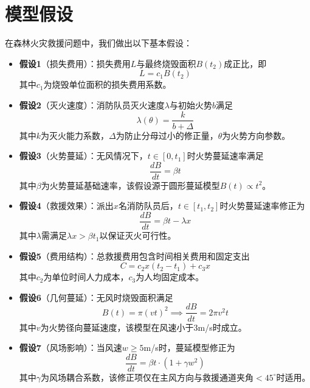 \section{模型假设}\label{sec:Premise}

在森林火灾救援问题中，我们做出以下基本假设：

\begin{itemize}[leftmargin=2em]
    \item \textbf{假设1}（损失费用）：损失费用$L$与最终烧毁面积$B(t_2)$成正比，即
        \begin{equation}
            L = c_1 B(t_2)
        \end{equation}
        其中$c_1$为烧毁单位面积的损失费用系数。

    \item \textbf{假设2}（灭火速度）：消防队员灭火速度$\lambda$与初始火势$b$满足
        \begin{equation}
            \lambda(\theta) = \frac{k}{b + \Delta}
        \end{equation}
        其中$k$为灭火能力系数，$\Delta$为防止分母过小的修正量，$\theta$为火势方向参数。

    \item \textbf{假设3}（火势蔓延）：无风情况下，$t \in [0, t_1]$时火势蔓延速率满足
        \begin{equation}
            \frac{dB}{dt} = \beta t
        \end{equation}
        其中$\beta$为火势蔓延基础速率，该假设源于圆形蔓延模型$B(t) \propto t^2$。

    \item \textbf{假设4}（救援效果）：派出$x$名消防队员后，$t \in [t_1, t_2]$时火势蔓延速率修正为
        \begin{equation}
            \frac{dB}{dt} = \beta t - \lambda x
        \end{equation}
        其中$\lambda$需满足$\lambda x > \beta t_1$以保证灭火可行性。

    \item \textbf{假设5}（费用结构）：总救援费用包含时间相关费用和固定支出
        \begin{equation}
            C = c_2 x (t_2 - t_1) + c_3 x
        \end{equation}
        其中$c_2$为单位时间人力成本，$c_3$为人均固定成本。

    \item \textbf{假设6}（几何蔓延）：无风时烧毁面积满足
        \begin{equation}
            B(t) = \pi (v t)^2 \implies \frac{dB}{dt} = 2\pi v^2 t
        \end{equation}
        其中$v$为火势径向蔓延速度，该模型在风速小于3m/s时成立。

    \item \textbf{假设7}（风场影响）：当风速$w \geq 5$m/s时，蔓延模型修正为
        \begin{equation}
            \frac{dB}{dt} = \beta t \cdot (1 + \gamma w^2)
        \end{equation}
        其中$\gamma$为风场耦合系数，该修正项仅在主风方向与救援通道夹角$<45^\circ$时适用。
\end{itemize}
